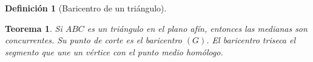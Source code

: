 \documentclass[11pt, a4paper]{article}
\makeatletter
\newif\IfInSansMode
\let\oldsf\sffamily
\renewcommand*{\sffamily}{\oldsf\mathversion{sans}\InSansModetrue}
\let\oldnorm\normalfont
\renewcommand*{\normalfont}{\oldnorm\InSansModefalse\mathversion{normal}}
\renewenvironment{proof}[1][\proofname] {\vspace{-15pt}\par\pushQED{\qed}\normalfont\topsep6\p@\@plus6\p@\relax\trivlist\item[\hskip\labelsep\it#1\@addpunct{.}]\ignorespaces}{\popQED\endtrivlist\@endpefalse}
\renewcommand{\vec}{\overrightarrow}
\renewenvironment{proof}[1][\proofname] {\par\pushQED{\qed}\normalfont\topsep6\p@\@plus6\p@\relax\trivlist\item[\hskip\labelsep\itshape\sffamily#1\@addpunct{.}]\ignorespaces}{\popQED\endtrivlist\@endpefalse}
\theoremstyle{theorem-style}
\newtheorem{nth}{Teorema}[section]
\theoremstyle{definition-style}
\newtheorem{ndef}{Definición}[section]
\theoremstyle{remark-style}
\theoremstyle{example-style}
\makeatother
\begin{document}
\begin{ndef}[Baricentro de un triángulo]
\begin{minipage}[]{0.27\textwidth}
\begin{center}
\end{center}

  \end{minipage}
\end{ndef}

\begin{nth}
  Si $ABC$ es un triángulo en el plano afín, entonces las medianas son concurrentes. Su punto de corte es el baricentro $(G)$. El baricentro triseca el segmento que une un vértice con el punto medio homólogo.


\end{nth}


\end{document}
